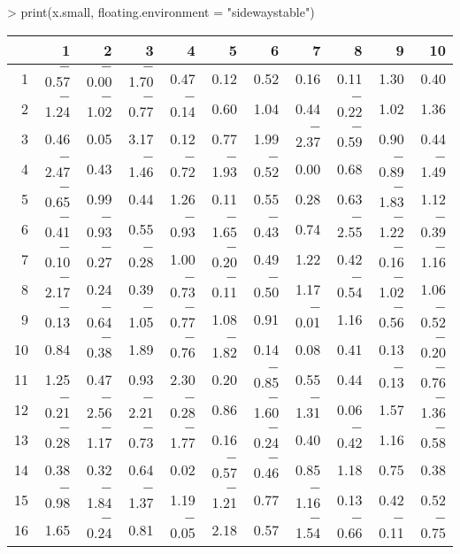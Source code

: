 \documentclass[letterpaper]{article}
\begin{document}
\begin{Schunk}
\begin{Sinput}
> print(x.small, floating.environment = "sidewaystable")
\end{Sinput}
% latex table generated in R 2.6.0 by xtable 1.5-2 package
% Wed Oct 10 14:26:37 2007
\begin{sidewaystable}[ht]
\begin{center}
\begin{tabular}{rrrrrrrrrrr}
  \hline
 & 1 & 2 & 3 & 4 & 5 & 6 & 7 & 8 & 9 & 10 \\
  \hline
1 & $-$0.57 & $-$0.00 & $-$1.70 & 0.47 & 0.12 & 0.52 & 0.16 & 0.11 & 1.30 & 0.40 \\
  2 & $-$1.24 & $-$1.02 & $-$0.77 & $-$0.14 & 0.60 & 1.04 & 0.44 & $-$0.22 & 1.02 & 1.36 \\
  3 & 0.46 & 0.05 & 3.17 & 0.12 & 0.77 & 1.99 & $-$2.37 & $-$0.59 & 0.90 & 0.44 \\
  4 & $-$2.47 & 0.43 & $-$1.46 & $-$0.72 & $-$1.93 & $-$0.52 & 0.00 & 0.68 & $-$0.89 & $-$1.49 \\
  5 & $-$0.65 & 0.99 & 0.44 & 1.26 & 0.11 & 0.55 & 0.28 & 0.63 & $-$1.83 & 1.12 \\
  6 & $-$0.41 & $-$0.93 & 0.55 & $-$0.93 & $-$1.65 & $-$0.43 & 0.74 & $-$2.55 & $-$1.22 & $-$0.39 \\
  7 & $-$0.10 & $-$0.27 & $-$0.28 & 1.00 & $-$0.20 & 0.49 & 1.22 & 0.42 & $-$0.16 & $-$1.16 \\
  8 & $-$2.17 & 0.24 & 0.39 & $-$0.73 & $-$0.11 & $-$0.50 & 1.17 & $-$0.54 & $-$1.02 & 1.06 \\
  9 & $-$0.13 & $-$0.64 & $-$1.05 & $-$0.77 & 1.08 & 0.91 & $-$0.01 & 1.16 & $-$0.56 & $-$0.52 \\
  10 & 0.84 & $-$0.38 & 1.89 & $-$0.76 & $-$1.82 & 0.14 & 0.08 & 0.41 & 0.13 & $-$0.20 \\
  11 & 1.25 & 0.47 & 0.93 & 2.30 & 0.20 & $-$0.85 & 0.55 & 0.44 & $-$0.13 & $-$0.76 \\
  12 & $-$0.21 & $-$2.56 & $-$2.21 & $-$0.28 & 0.86 & $-$1.60 & $-$1.31 & 0.06 & 1.57 & $-$1.36 \\
  13 & $-$0.28 & $-$1.17 & $-$0.73 & $-$1.77 & 0.16 & $-$0.24 & 0.40 & $-$0.42 & 1.16 & $-$0.58 \\
  14 & 0.38 & 0.32 & 0.64 & 0.02 & $-$0.57 & $-$0.46 & 0.85 & 1.18 & 0.75 & 0.38 \\
  15 & $-$0.98 & $-$1.84 & $-$1.37 & 1.19 & $-$1.21 & 0.77 & $-$1.16 & 0.13 & 0.42 & 0.52 \\
  16 & 1.65 & $-$0.24 & 0.81 & $-$0.05 & 2.18 & 0.57 & $-$1.54 & $-$0.66 & $-$0.11 & $-$0.75 \\

\end{tabular}
\end{center}
\end{sidewaystable}
\end{Schunk}
\end{document}
